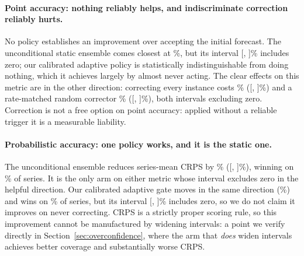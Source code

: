 \begin{table}[htbp]
\centering
\caption{Correction policies under point and probabilistic accuracy. Both panels use the
same instances, the same action space and the same policies; only the scored quantity
differs. Negative percentages favour the policy over never correcting. Effects are
series-level with 95\% bootstrap intervals over series; $\dagger$ marks an interval
excluding zero. The win rate is the fraction of series on which the policy beats never
correcting, reported alongside the mean because the two disagree here.}
\label{tab:headline}
\small
\fittable{}
\end{table}

\paragraph{Point accuracy: nothing reliably helps, and indiscriminate correction
reliably hurts.}
No policy establishes an improvement over accepting the initial forecast. The
unconditional static ensemble comes closest at \maseAlwaysEnsembleVsNeverPct\%, but its
interval [\maseAlwaysEnsembleVsNeverCIlo, \maseAlwaysEnsembleVsNeverCIhi]\% includes
zero; our calibrated adaptive policy is statistically indistinguishable from doing
nothing, which it achieves largely by almost never acting. The clear effects on this
metric are in the other direction: correcting every instance costs
\maseAlwaysCorrectVsNeverPct\% ([\maseAlwaysCorrectVsNeverCIlo,
\maseAlwaysCorrectVsNeverCIhi]\%) and a rate-matched random corrector
\maseRandomCorrectVsNeverPct\% ([\maseRandomCorrectVsNeverCIlo,
\maseRandomCorrectVsNeverCIhi]\%), both intervals excluding zero. Correction is not a
free option on point accuracy: applied without a reliable trigger it is a measurable
liability.

\paragraph{Probabilistic accuracy: one policy works, and it is the static one.}
The unconditional ensemble reduces series-mean CRPS by
\crpsAlwaysEnsembleVsNeverAbs\% ([\crpsAlwaysEnsembleVsNeverAbsCIlo,
\crpsAlwaysEnsembleVsNeverAbsCIhi]\%), winning on
\crpsAlwaysEnsembleVsNeverWinRate\% of series. It is the only arm on either metric whose
interval excludes zero in the helpful direction. Our calibrated adaptive gate moves in
the same direction (\crpsRgcCalibratedVsNeverPct\%) and wins on
\crpsRgcCalibratedVsNeverWinRate\% of series, but its interval
[\crpsRgcCalibratedVsNeverCIlo, \crpsRgcCalibratedVsNeverCIhi]\% includes zero, so we do
not claim it improves on never correcting. CRPS is a strictly proper scoring rule, so
this improvement cannot be manufactured by widening intervals: a point we verify
directly in Section~\ref{sec:overconfidence}, where the arm that \emph{does} widen
intervals achieves better coverage and substantially worse CRPS.

